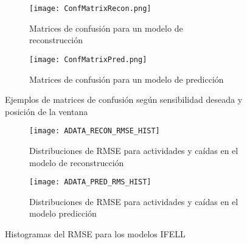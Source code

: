 \begin{sidewaysfigure}[!ht]
  \centering
  \begin{subfigure}[b]{0.45\textwidth}
      \centering
      \texttt{[image: ConfMatrixRecon.png]}
      \caption{\footnotesize \label{fig:ifell:adata:confmat:recon}Matrices de confusión para un modelo de reconstrucción}
  \end{subfigure}
  \hfill
  \begin{subfigure}[b]{0.45\textwidth}
      \centering
      \texttt{[image: ConfMatrixPred.png]}
      \caption{\footnotesize \label{fig:ifell:adata:confmat:pred}Matrices de confusión para un modelo de predicción}
  \end{subfigure}
  \caption{\label{fig:ifell:adata:confmats}Ejemplos de matrices de confusión según sensibilidad deseada y posición de la ventana}
\end{sidewaysfigure}


\begin{figure}[!ht]
  \centering
  \begin{subfigure}[b]{0.45\textwidth}
      \centering
      \texttt{[image: ADATA\_RECON\_RMSE\_HIST]}
      \caption{\footnotesize \label{fig:ifell:adata:rmshist:recon}Distribuciones de RMSE para actividades y caídas en el modelo de reconstrucción}
  \end{subfigure}
  \hfill
  \begin{subfigure}[b]{0.45\textwidth}
      \centering
      \texttt{[image: ADATA\_PRED\_RMS\_HIST]}
      \caption{\footnotesize \label{fig:ifell:adata:rmshist:pred}Distribuciones de RMSE para actividades y caídas en el modelo predicción}
  \end{subfigure}
  \caption{\label{fig:ifell:adata:rmshist}Histogramas del RMSE para los modelos IFELL}
\end{figure}


